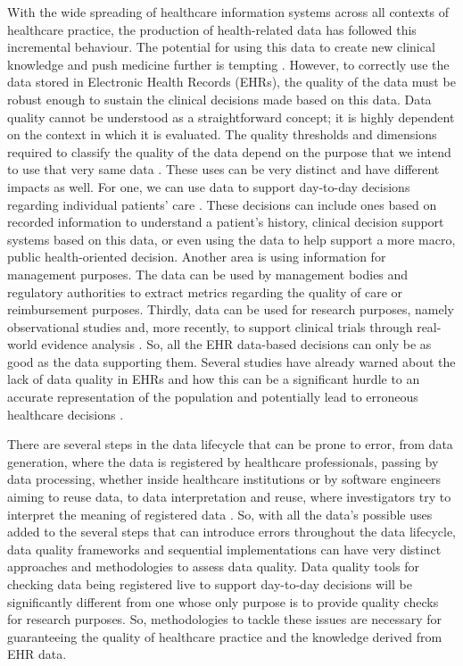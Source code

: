 With the wide spreading of healthcare information systems across all contexts of healthcare practice, the production of health-related data has followed this incremental behaviour. The potential for using this data to create new clinical knowledge and push medicine further is tempting \cite{martin-sanchezBigDataMedicine2014}.
However, to correctly use the data stored in Electronic Health Records (EHRs), the quality of the data must be robust enough to sustain the clinical decisions made based on this data. Data quality cannot be understood as a straightforward concept; it is highly dependent on the context in which it is evaluated. The quality thresholds and dimensions required to classify the quality of the data depend on the purpose that we intend to use that very same data \cite{waljiElectronicHealthRecords2019}. These uses can be very distinct and have different impacts as well. For one, we can use data to support day-to-day decisions regarding individual patients' care \cite{verheijPossibleSourcesBias2018}. These decisions can include ones based on recorded information to understand a patient's history, clinical decision support systems based on this data, or even using the data to help support a more macro, public health-oriented decision. Another area is using information for management purposes. The data can be used by management bodies and regulatory authorities to extract metrics regarding the quality of care or reimbursement purposes. Thirdly, data can be used for research purposes, namely observational studies and, more recently, to support clinical trials through real-world evidence analysis \cite{coreyAssessingQualitySurgical2020,verheijPossibleSourcesBias2018,wengClinicalDataQuality2020}. 
So, all the EHR data-based decisions can only be as good as the data supporting them. Several studies have already warned about the lack of data quality in EHRs and how this can be a significant hurdle to an accurate representation of the population and potentially lead to erroneous healthcare decisions \cite{reimerDataQualityAssessment2016a,joukesImpactElectronicPaperBased2019a,huserMultisiteEvaluationData2016,zhangUnderstandingDetectingDefects2020,kramerImpactDataQuality2021,gigantiImpactDataQuality2019}.

There are several steps in the data lifecycle that can be prone to error, from data generation, where the data is registered by healthcare professionals, passing by data processing, whether inside healthcare institutions or by software engineers aiming to reuse data, to data interpretation and reuse, where investigators try to interpret the meaning of registered data \cite{wengClinicalDataQuality2020}.
So, with all the data's possible uses added to the several steps that can introduce errors throughout the data lifecycle, data quality frameworks and sequential implementations can have very distinct approaches and methodologies to assess data quality. Data quality tools for checking data being registered live to support day-to-day decisions will be significantly different from one whose only purpose is to provide quality checks for research purposes. So, methodologies to tackle these issues are necessary for guaranteeing the quality of healthcare practice and the knowledge derived from EHR data. 

